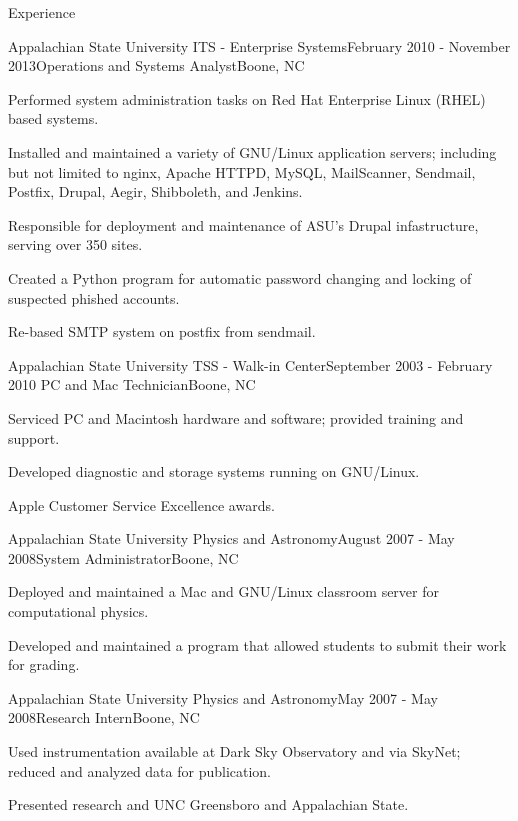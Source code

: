 \documentclass{cv} %
\begin{document}
\begin{rSection}{Experience}
\begin{rSubsection}{Appalachian State University ITS - Enterprise Systems}{February 2010 - November 2013}{Operations and Systems Analyst}{Boone, NC}
\item Performed system administration tasks on Red Hat Enterprise Linux (RHEL) based systems.
\item Installed and maintained a variety of GNU/Linux application servers; including but not limited to nginx, Apache HTTPD, MySQL, MailScanner, Sendmail, Postfix, Drupal, Aegir, Shibboleth, and Jenkins.
\item Responsible for deployment and maintenance of ASU's Drupal infastructure, serving over 350 sites.
\item Created a Python program for automatic password changing and locking of suspected phished accounts.
\item Re-based SMTP system on postfix from sendmail. 
\end{rSubsection}


\begin{rSubsection}{Appalachian State University TSS - Walk-in Center}{September 2003 - February 2010
}{PC and Mac Technician}{Boone, NC}
\item Serviced PC and Macintosh hardware and software; provided training and support.
\item Developed diagnostic and storage systems running on GNU/Linux.
\item Apple Customer Service Excellence awards.
\end{rSubsection}

\begin{rSubsection}{Appalachian State University Physics and Astronomy}{August 2007 - May 2008}{System Administrator}{Boone, NC}
\item Deployed and maintained a Mac and GNU/Linux classroom server for computational physics.
\item Developed and maintained a program that allowed students to submit their work for grading.
\end{rSubsection}

\begin{rSubsection}{Appalachian State University Physics and Astronomy}{May 2007 - May 2008}{Research Intern}{Boone, NC}
\item Used instrumentation available at Dark Sky Observatory and via SkyNet; reduced and analyzed data for publication.
\item Presented research and UNC Greensboro and Appalachian State.
\end{rSubsection}


\end{rSection}
\end{document}
